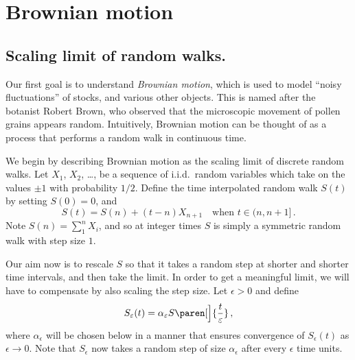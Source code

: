 
\ifstandalonechapter\setcounter{chapter}{1}\fi
\chapter{Brownian motion}
\section{Scaling limit of random walks.}
Our first goal is to understand \emph{Brownian motion}, which is used to model ``noisy fluctuations'' of stocks, and various other objects.
This is named after the botanist Robert Brown, who observed that the microscopic movement of pollen grains appears random.
Intuitively, Brownian motion can be thought of as a process that performs a random walk in continuous time.

We begin by describing Brownian motion as the scaling limit of discrete random walks.
Let $X_1$, $X_2$, \dots, be a sequence of i.i.d.\ random variables which take on the values $\pm 1$ with probability $1/2$.
Define the time interpolated random walk $S(t)$ by setting $S(0) = 0$, and
\begin{equation}\label{e:S}
  S(t) = S(n) + (t - n) X_{n+1}
  \quad\text{when } t \in (n, n+1]\,.
\end{equation}
Note $S(n) = \sum_{1}^n X_i$, and so at integer times $S$ is simply a symmetric random walk with step size $1$.

Our aim now is to rescale $S$ so that it takes a random step at shorter and shorter time intervals, and then take the limit.
In order to get a meaningful limit, we will have to compensate by also scaling the step size.
Let $\epsilon > 0$ and define
\begin{equation}\label{e:Sep}
  S_\epsilon(t) = \alpha_\epsilon S\paren[\Big]{ \frac{t}{\epsilon} }\,,
\end{equation}
where $\alpha_\epsilon$ will be chosen below in a manner that ensures convergence of $S_\epsilon(t)$ as $\epsilon \to 0$.
Note that $S_\epsilon$ now takes a random step of size $\alpha_\epsilon$ after every $\epsilon$ time units.

